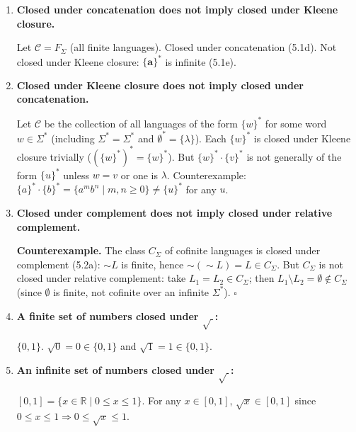 \begin{enumerate}[{5.}1. ]
If $\mathcal{C}$ is closed under intersection and complement, then for any $L_1,L_2\in\mathcal{C}$:
$\sim L_1,\sim L_2\in\mathcal{C}$ (by closure under complement), so
$\sim L_1\cap\sim L_2\in\mathcal{C}$ (by closure under intersection), so
$\sim(\sim L_1\cap\sim L_2)=L_1\cup L_2\in\mathcal{C}$ (by De Morgan and closure under complement).  Hence $\mathcal{C}$ is also closed under union. \qed

\item \textbf{Closed under concatenation does not imply closed under Kleene closure.}

Let $\mathcal{C}=F_\Sigma$ (all finite languages).  Closed under concatenation (5.1d).  Not closed under Kleene closure: $\{\pmb{a}\}^*$ is infinite (5.1e).

\item \textbf{Closed under Kleene closure does not imply closed under concatenation.}

Let $\mathcal{C}$ be the collection of all languages of the form $\{w\}^*$ for some word $w\in\Sigma^*$ (including $\Sigma^*=\Sigma^*$ and $\emptyset^*=\{\lambda\}$).  Each $\{w\}^*$ is closed under Kleene closure trivially ($(\{w\}^*)^*=\{w\}^*$).  But $\{w\}^*\cdot\{v\}^*$ is not generally of the form $\{u\}^*$ unless $w=v$ or one is $\lambda$.  Counterexample: $\{a\}^*\cdot\{b\}^*=\{a^mb^n\mid m,n\ge 0\}\neq\{u\}^*$ for any $u$.

\item \textbf{Closed under complement does not imply closed under relative complement.}

\textbf{Counterexample.}  The class $C_\Sigma$ of cofinite languages is closed under complement (5.2a): $\sim L$ is finite, hence $\sim(\sim L)=L\in C_\Sigma$.  But $C_\Sigma$ is not closed under relative complement: take $L_1=L_2\in C_\Sigma$; then $L_1\setminus L_2=\emptyset\notin C_\Sigma$ (since $\emptyset$ is finite, not cofinite over an infinite $\Sigma^*$). $\square$

\item \textbf{A finite set of numbers closed under $\sqrt{\ }$:}

$\{0,1\}$.  $\sqrt{0}=0\in\{0,1\}$ and $\sqrt{1}=1\in\{0,1\}$.

\item \textbf{An infinite set of numbers closed under $\sqrt{\ }$:}

$[0,1]=\{x\in\mathbb{R}\mid 0\le x\le 1\}$.  For any $x\in[0,1]$, $\sqrt{x}\in[0,1]$ since $0\le x\le 1\Rightarrow 0\le\sqrt{x}\le 1$.


\end{enumerate}
